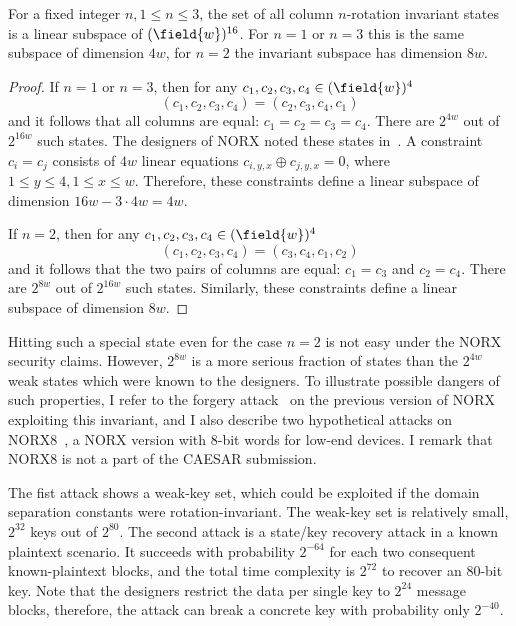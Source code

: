 \begin{proposition}
For a fixed integer $n, 1 \le n \le 3$, the set of all column $n$-rotation invariant states is a linear subspace of $(\field{w})^{16}$.
For $n = 1$ or $n = 3$ this is the same subspace of dimension $4w$,
for $n = 2$ the invariant subspace has dimension $8w$.
\end{proposition}
\begin{proof}
    If $n=1$ or $n=3$, then for any $c_1, c_2, c_3, c_4 \in (\field{w})^4$
    $$
    (c_1, c_2, c_3, c_4) = (c_2, c_3, c_4, c_1)
    $$
    and it follows that all columns are equal: $c_1 = c_2 = c_3 = c_4$. There are $2^{4w}$ out of $2^{16w}$ such states. The designers of NORX noted these states in~\cite{DBLP:conf/latincrypt/AumassonJN14}. A constraint $c_i = c_j$ consists of $4w$ linear equations $c_{i,y,x} \oplus c_{j,y,x} = 0$, where $1 \le y \le 4, 1 \le x \le w$. Therefore, these constraints define a linear subspace of dimension $16w - 3\cdot 4w = 4w$.

    If $n = 2$, then for any $c_1, c_2, c_3, c_4 \in (\field{w})^4$ $$
    (c_1, c_2, c_3, c_4) = (c_3, c_4, c_1, c_2)
    $$
    and it follows that the two pairs of columns are equal: $c_1 = c_3$ and $c_2 = c_4$. There are $2^{8w}$ out of $2^{16w}$ such states. Similarly, these constraints define a linear subspace of dimension $8w$.
\end{proof}

Hitting such a special state even for the case $n=2$ is not easy under the NORX security claims. However, $2^{8w}$ is a more serious fraction of states than the $2^{4w}$ weak states which were known to the designers. To illustrate possible dangers of such properties, I refer to the forgery attack~\cite{NORXfse} on the previous version of NORX exploiting this invariant, and I also describe two hypothetical attacks on NORX8~\cite{aumasson2015norx8}, a NORX version with 8-bit words for low-end devices. I remark that NORX8 is not a part of the CAESAR submission.

The fist attack shows a weak-key set, which could be exploited if the domain separation constants were rotation-invariant. The weak-key set is relatively small, $2^{32}$ keys out of $2^{80}$. The second attack is a state/key recovery attack in a known plaintext scenario. It succeeds with probability $2^{-64}$ for each two consequent known-plaintext blocks, and the total time complexity is $2^{72}$ to recover an 80-bit key. Note that the designers restrict the data per single key to $2^{24}$ message blocks, therefore, the attack can break a concrete key with probability only $2^{-40}$.

